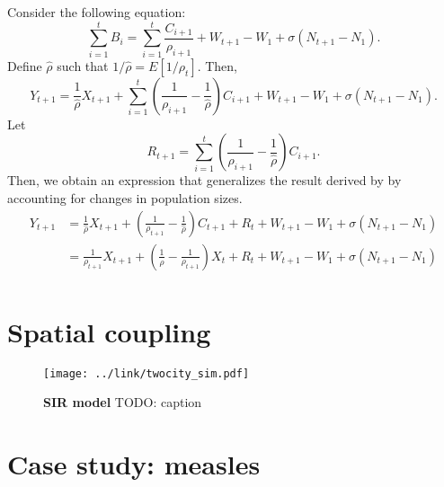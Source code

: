\documentclass{article}
\begin{document}
Consider the following equation:
\begin{equation}
\sum_{i=1}^t B_i = \sum_{i=1}^t \frac{C_{i+1}}{\rho_{i+1}} + W_{t+1} - W_1 + \sigma (N_{t+1} - N_1).
\end{equation}
Define $\hat{\rho}$ such that $1/\hat{\rho} = E[1/\rho_t]$.
Then,
\begin{equation}
Y_{t+1} = \frac{1}{\hat{\rho}} X_{t+1} + \sum_{i=1}^t \left(\frac{1}{\rho_{i+1}} - \frac{1}{\hat{\rho}}\right) C_{i+1} + W_{t+1} - W_1 + \sigma (N_{t+1} - N_1).
\end{equation}
Let 
$$
R_{t+1} = \sum_{i=1}^t \left(\frac{1}{\rho_{i+1}} - \frac{1}{\hat{\rho}}\right) C_{i+1}.
$$
Then, we obtain an expression that generalizes the result derived by \cite{finkenstadt2000time} by accounting for changes in population sizes.
\begin{equation}
\begin{aligned}
Y_{t+1} &= \frac{1}{\hat{\rho}} X_{t+1} + \left(\frac{1}{\rho_{t+1}} - \frac{1}{\hat{\rho}}\right) C_{t+1} + R_{t} + W_{t+1} - W_1 + \sigma (N_{t+1} - N_1)\\
&= \frac{1}{\rho_{t+1}} X_{t+1} + \left(\frac{1}{\hat{\rho}}  - \frac{1}{\rho_{t+1}} \right) X_{t} + R_{t} + W_{t+1} - W_1 + \sigma (N_{t+1} - N_1)\\
\end{aligned}
\end{equation}

\section{Spatial coupling}

\begin{figure}
\texttt{[image: ../link/twocity\_sim.pdf]}
\caption{\textbf{SIR model} TODO: caption}
\end{figure}

\section{Case study: measles}




\end{document}
